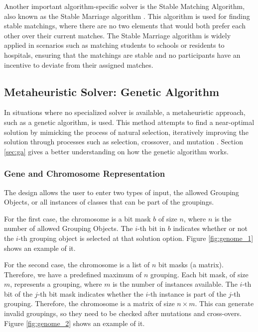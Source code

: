         Another important algorithm-specific solver is the Stable Matching Algorithm, also known as the Stable Marriage algorithm \cite{gale1962college}. This algorithm is used for finding stable matchings, where there are no two elements that would both prefer each other over their current matches. The Stable Marriage algorithm is widely applied in scenarios such as matching students to schools or residents to hospitals, ensuring that the matchings are stable and no participants have an incentive to deviate from their assigned matches.
            
       \subsection{Metaheuristic Solver: Genetic Algorithm}
            In situations where no specialized solver is available, a metaheuristic approach, such as a genetic algorithm, is used. This method attempts to find a near-optimal solution by mimicking the process of natural selection, iteratively improving the solution through processes such as selection, crossover, and mutation \cite{holland1992adaptation}. Section \ref{sec:ga} gives a better understanding on how the genetic algorithm works.

        \subsubsection{Gene and Chromosome Representation} \label{sec:gene}
            The design allows the user to enter two types of input, the allowed Grouping Objects, or all instances of classes that can be part of the groupings.
            
            For the first case, the chromosome is a bit mask $b$ of size $n$, where $n$ is the number of allowed Grouping Objects. The $i$-th bit in $b$ indicates whether or not the $i$-th grouping object is selected at that solution option. Figure \ref{fig:genome_1} shows an example of it.

            

            For the second case, the chromosome is a list of $n$ bit masks (a matrix). 
            Therefore, we have a predefined maximum of $n$ grouping.
            Each bit mask, of size $m$, represents a grouping, where
            $m$ is the number of instances available. 
            The $i$-th bit of the $j$-th bit mask indicates whether the $i$-th instance is part of the $j$-th grouping. 
            Therefore, the chromosome is a matrix of size $n\times m$. 
            This can generate invalid groupings, so they need to be checked after mutations and cross-overs. Figure \ref{fig:genome_2} shows an example of it.

